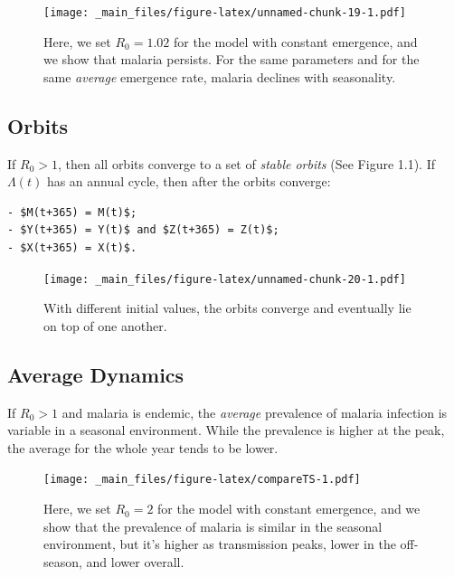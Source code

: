 \documentclass[
]{book}
\begin{document}
\begin{figure}
\centering
\texttt{[image: \_main\_files/figure-latex/unnamed-chunk-19-1.pdf]}
\caption{\label{fig:unnamed-chunk-19}Here, we set \(R_0= 1.02\) for the model with constant emergence, and we show that malaria persists. For the same parameters and for the same \emph{average} emergence rate, malaria declines with seasonality.}
\end{figure}

\clearpage

\hypertarget{orbits}{%
\subsection{Orbits}\label{orbits}}

If \(R_0 >1\), then all orbits converge to a set of \emph{stable orbits} (See Figure 1.1). If \(\Lambda(t)\) has an annual cycle, then after the orbits converge:

\begin{verbatim}
- $M(t+365) = M(t)$; 
- $Y(t+365) = Y(t)$ and $Z(t+365) = Z(t)$; 
- $X(t+365) = X(t)$. 
\end{verbatim}

\begin{figure}
\centering
\texttt{[image: \_main\_files/figure-latex/unnamed-chunk-20-1.pdf]}
\caption{\label{fig:unnamed-chunk-20}With different initial values, the orbits converge and eventually lie on top of one another.}
\end{figure}

\clearpage

\hypertarget{average-dynamics}{%
\subsection{Average Dynamics}\label{average-dynamics}}

If \(R_0>1\) and malaria is endemic, the \emph{average} prevalence of malaria infection is variable in a seasonal environment. While the prevalence is higher at the peak, the average for the whole year tends to be lower.

\begin{figure}
\centering
\texttt{[image: \_main\_files/figure-latex/compareTS-1.pdf]}
\caption{\label{fig:compareTS}Here, we set \(R_0= 2\) for the model with constant emergence, and we show that the prevalence of malaria is similar in the seasonal environment, but it's higher as transmission peaks, lower in the off-season, and lower overall.}
\end{figure}
\end{document}
